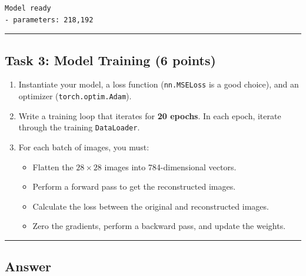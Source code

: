 \documentclass[
  letterpaper,
  DIV=11,
  numbers=noendperiod]{scrartcl}
\providecommand{\tightlist}{%
  \setlength{\itemsep}{0pt}\setlength{\parskip}{0pt}}\usepackage{longtable,booktabs,array}
\begin{document}
\label{task2}
\begin{verbatim}
Model ready
- parameters: 218,192
\end{verbatim}

\begin{center}\rule{0.5\linewidth}{0.5pt}\end{center}

\subsection{Task 3: Model Training (6
points)}\label{task-3-model-training-6-points}

\begin{enumerate}
\def\labelenumi{\arabic{enumi}.}
\tightlist
\item
  Instantiate your model, a loss function (\texttt{nn.MSELoss} is a good
  choice), and an optimizer (\texttt{torch.optim.Adam}).
\item
  Write a training loop that iterates for \textbf{20 epochs}. In each
  epoch, iterate through the training \texttt{DataLoader}.
\item
  For each batch of images, you must:

  \begin{itemize}
  \tightlist
  \item
    Flatten the \(28\times28\) images into 784-dimensional vectors.
  \item
    Perform a forward pass to get the reconstructed images.
  \item
    Calculate the loss between the original and reconstructed images.
  \item
    Zero the gradients, perform a backward pass, and update the weights.
  \end{itemize}
\end{enumerate}

\begin{center}\rule{0.5\linewidth}{0.5pt}\end{center}

\subsection{Answer}\label{answer-5}
\end{document}
